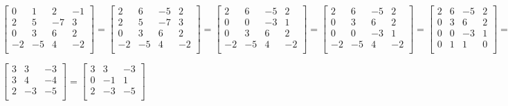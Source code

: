 \begin{ex}
$\begin{bmatrix}
0 & 1 & 2 &-1\\
2&5&-7&3\\
0&3&6&2\\
-2&-5&4&-2\\
\end{bmatrix} =\begin{bmatrix}
2 & 6 & -5 &2\\
2&5&-7&3\\
0&3&6&2\\
-2&-5&4&-2\\
\end{bmatrix}=\begin{bmatrix}
2 & 6 & -5 &2\\
0&0&-3&1\\
0&3&6&2\\
-2&-5&4&-2\\
\end{bmatrix}=\begin{bmatrix}
2 & 6 & -5 &2\\
0&3&6&2\\
0&0&-3&1\\
-2&-5&4&-2\\
\end{bmatrix}=\begin{bmatrix}
2 & 6 & -5 &2\\
0&3&6&2\\
0&0&-3&1\\
0&1&1&0\\
\end{bmatrix}=\begin{bmatrix}
2 & 6 & -5 &2\\
0&1&1&0\\
0&3&6&2\\
0&0&-3&1\\
\end{bmatrix}$
\end{ex}
\begin{ex}
$\begin{bmatrix}
3&3&-3\\
3&4&-4\\
2&-3&-5\\
\end{bmatrix}=\begin{bmatrix}
3&3&-3\\
0&-1&1\\
2&-3&-5\\
\end{bmatrix}$
\end{ex}
